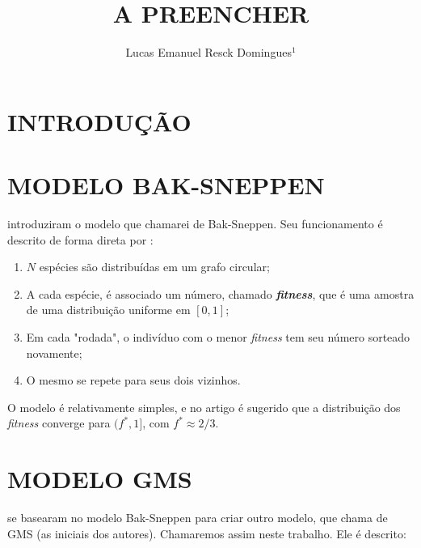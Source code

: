 \documentclass[10pt,brazil,english]{article}
\title{A PREENCHER}
\author{Lucas Emanuel Resck Domingues$^{1}$}
\begin{document}
    \pagestyle{fancy} %
    
    \maketitle
    \newpage

    \newtheorem{theorem}{Teorema}
    
    \section{\uppercase{Introdução}}
    
    \section{\uppercase{Modelo Bak-Sneppen}}

         introduziram o modelo que chamarei de Bak-Sneppen.
        Seu funcionamento é descrito de forma direta por :

        \renewcommand{\theenumi}{\roman{enumi}} 
        \begin{enumerate}
            \item $N$ espécies são distribuídas em um grafo circular;
            \item A cada espécie, é associado um número, chamado \textit{\textbf{fitness}}, que é uma amostra de uma distribuição uniforme em $[0, 1]$;
            \item Em cada "rodada", o indivíduo com o menor \textit{fitness} tem seu número sorteado novamente;
            \item O mesmo se repete para seus dois vizinhos.
        \end{enumerate}

        O modelo é relativamente simples, e no artigo é sugerido que a distribuição dos \textit{fitness} converge para $(f^*, 1]$, com $f^* \approx 2/3$.

    \section{\uppercase{Modelo GMS}}

         se basearam no modelo Bak-Sneppen para criar outro modelo, que  chama de GMS (as iniciais dos autores). Chamaremos assim neste trabalho. Ele é descrito:
\end{document}
